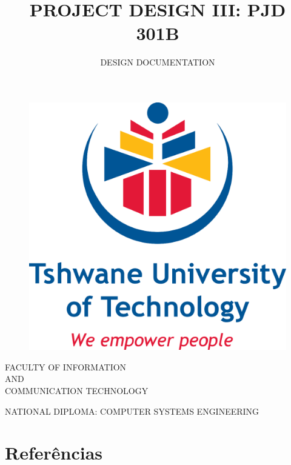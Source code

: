 \documentclass[a4paper,12pt,singlespacing]{article}
\title{PROJECT DESIGN III: PJD 301B}
\author{DESIGN DOCUMENTATION}
\def\emails{e-mail do aluno 1, e-mail do aluno 2, e-mail do aluno 3, e-mail do Orientador, e-mail do Coorientador}
\begin{document}
    {\centering
		\begin{figure}[!ht]
			\centering
			\includegraphics[scale=0.15]{./tut_logo.png}
		\end{figure}

        \setlength{\parskip}{0pt}
		FACULTY OF INFORMATION \\ AND \\  COMMUNICATION TECHNOLOGY

        \setlength{\parskip}{18pt}
		NATIONAL DIPLOMA: COMPUTER SYSTEMS ENGINEERING

        \setlength{\parskip}{18pt}
        \textbf{ \thetitle }
        \setlength{\parskip}{12pt}

        \theauthor

        \setlength{\parskip}{6pt}

    }


    \clearpage  %
    \tableofcontents
    \clearpage  %


    \justifying


    

    

    

    

    

    

    

    

    \section{Referências}

    \raggedright
    \printbibliography[heading=none]
\end{document}
